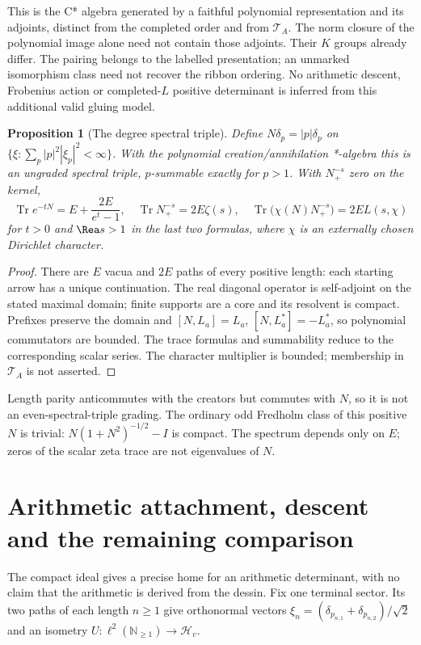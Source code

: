 \documentclass[11pt,oneside,openany]{book}
\newtheorem{proposition}[theorem]{Proposition}
\theoremstyle{definition}\newtheorem{definition}[theorem]{Definition}
\theoremstyle{remark}\newtheorem{remark}[theorem]{Remark}
\begin{document}
This is the C* algebra generated by a faithful polynomial representation and its adjoints, distinct from the completed order and from $\mathcal T_A$. The norm closure of the polynomial image alone need not contain those adjoints. Their $K$ groups already differ. The pairing belongs to the labelled presentation; an unmarked isomorphism class need not recover the ribbon ordering. No arithmetic descent, Frobenius action or completed-$L$ positive determinant is inferred from this additional valid gluing model.


\begin{proposition}[The degree spectral triple]\label{thm:degree}
Define $N\delta_p=|p|\delta_p$ on $\{\xi:\sum_p|p|^2|\xi_p|^2<\infty\}$. With the polynomial creation/annihilation *-algebra this is an ungraded spectral triple, $p$-summable exactly for $p>1$. With $N_+^{-s}$ zero on the kernel,
\[
 \operatorname{Tr}e^{-tN}=E+\frac{2E}{e^t-1},\quad
 \operatorname{Tr}N_+^{-s}=2E\zeta(s),\quad
 \operatorname{Tr}\bigl(\chi(N)N_+^{-s}\bigr)=2E L(s,\chi)
\]
for $t>0$ and $\Rea s>1$ in the last two formulas, where $\chi$ is an externally chosen Dirichlet character.
\end{proposition}
\begin{proof}
There are $E$ vacua and $2E$ paths of every positive length: each starting arrow has a unique continuation. The real diagonal operator is self-adjoint on the stated maximal domain; finite supports are a core and its resolvent is compact. Prefixes preserve the domain and $[N,L_a]=L_a$, $[N,L_a^*]=-L_a^*$, so polynomial commutators are bounded. The trace formulas and summability reduce to the corresponding scalar series. The character multiplier is bounded; membership in $\mathcal T_A$ is not asserted.
\end{proof}
Length parity anticommutes with the creators but commutes with $N$, so it is not an even-spectral-triple grading. The ordinary odd Fredholm class of this positive $N$ is trivial: $N(1+N^2)^{-1/2}-I$ is compact. The spectrum depends only on $E$; zeros of the scalar zeta trace are not eigenvalues of $N$.


\chapter{Arithmetic attachment, descent and the remaining comparison}
The compact ideal gives a precise home for an arithmetic determinant, with no claim that the arithmetic is derived from the dessin. Fix one terminal sector. Its two paths of each length $n\ge1$ give orthonormal vectors $\xi_n=(\delta_{p_{n,1}}+\delta_{p_{n,2}})/\sqrt2$ and an isometry $U:\ell^2(\mathbb N_{\ge1})\to\mathcal H_v$.
\end{document}

